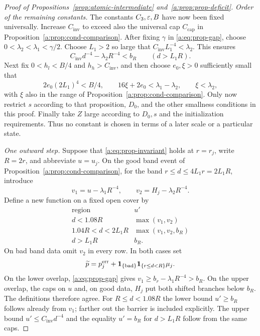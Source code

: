 \begin{proof}[Proof of Propositions~\ref{prop:atomic-intermediate} and~\ref{a:prop:prop-deficit}]
\emph{Order of the remaining constants.}
The constants $C_3,\varepsilon,B$ have now been fixed universally.
Increase $C_{\mathrm{inv}}$ to exceed also the universal cap
$C_{\mathrm{cap}}$ in Proposition~\ref{a:prop:cond-comparison}.
After fixing $\gamma$ in \eqref{a:eq:prop-gap}, choose
$0<\lambda_2<\lambda_1<\gamma/2$.  Choose $L_1>2$ so large that
$C_{\mathrm{inv}}L_1^{-4}<\lambda_2$.  This ensures
\[
 C_{\mathrm{inv}}d^{-4}-\lambda_2R^{-4}<b_R
 \qquad(d>L_1R).
\]
Next fix $0<h_l<B/4$ and $h_h>C_{\mathrm{inv}}$, and then choose
$e_0,\xi>0$ sufficiently small that
\begin{equation}
\label{a:eq:prop-choices}
 2e_0(2L_1)^4<B/4,\qquad
 16\xi+2e_0<\lambda_1-\lambda_2,\qquad \xi<\lambda_2,
\end{equation}
with $\xi$ also in the range of Proposition~\ref{a:prop:cond-comparison}.
Only now restrict $s$ according to that proposition, $D_0$, and the
other smallness conditions in this proof.  Finally take $Z$ large
according to $D_0,s$ and the initialization requirements.  Thus no
constant is chosen in terms of a later scale or a particular state.

\emph{One outward step.}
Suppose that \eqref{a:eq:prop-invariant} holds at $r=r_j$, write
$R=2r$, and abbreviate $u=u_j$.  On the good band event of
Proposition~\ref{a:prop:cond-comparison}, for the band
$r\le d\le4L_1r=2L_1R$, introduce
\[
 v_1=u-\lambda_1R^{-4},\qquad
 v_2=H_j-\lambda_2R^{-4}.
\]
Define a new function on a fixed open cover by
\begin{equation}
\label{a:eq:prop-branches}
 \begin{array}{c|c}
 \text{region}&u'\\ \hline
 d<1.08R&\max(v_1,v_2)\\
 1.04R<d<2L_1R&\max(v_1,v_2,b_R)\\
 d>L_1R&b_R.
 \end{array}
\end{equation}
On bad band data omit $v_2$ in every row.  In both cases set
\begin{equation}
\label{a:eq:prop-step-error}
 \widetilde p=p_j^{\mathrm{err}}
           +\mathbf 1_{\{\mathrm{bad}\}}\mathbf 1_{\{r\le d<R\}}\mu_j.
\end{equation}
On the lower overlap, \eqref{a:eq:prop-gap} gives
$v_1\ge b_r-\lambda_1R^{-4}>b_R$.  On the upper overlap, the caps
on $u$ and, on good data, $H_j$ put both shifted branches below $b_R$.
The definitions therefore agree.  For $R\le d<1.08R$ the lower bound
$u'\ge b_R$ follows already from $v_1$; farther out the barrier is
included explicitly.  The upper bound $u'\le C_{\mathrm{inv}}d^{-4}$
and the equality $u'=b_R$ for $d>L_1R$ follow from the same caps.


\end{proof}
